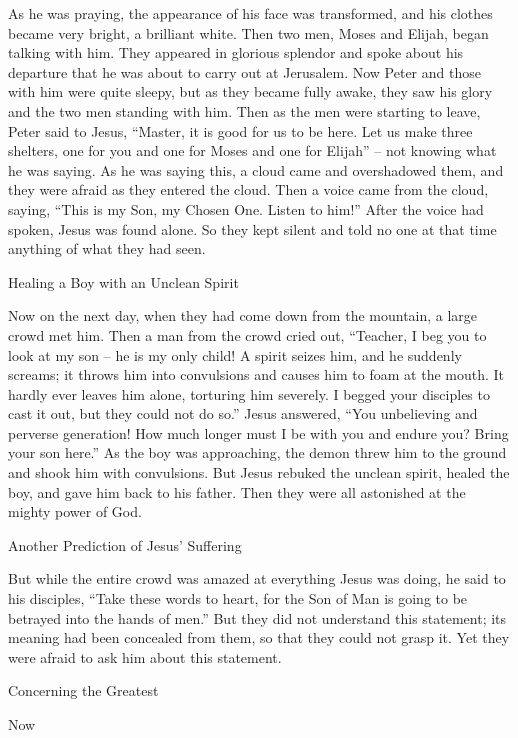 {As he was
praying,
the appearance
of his
face
was transformed,
and
his
clothes
became very bright, a brilliant
white.
Then
two
men,
Moses
and
Elijah,
began talking
with him.
They appeared
in
glorious splendor
and spoke
about his
departure
that he was
about
to carry out
at
Jerusalem.
Now
Peter
and
those with
him
were
quite sleepy,
but as they became fully awake,
they saw
his
glory
and
the two
men
standing
with him.
Then
as the men
were starting to leave,
Peter
said
to
Jesus,
“Master,
it is
good
for us
to be
here.
Let us make
three
shelters,
one
for you
and
one
for Moses
and
one
for Elijah”
– not
knowing
what
he was saying.
As he was saying
this,
a cloud
came
and
overshadowed
them,
and
they were afraid
as
they entered
the cloud.
Then
a voice
came
from
the cloud,
saying,
“This
is
my
Son,
my Chosen One.
Listen
to him!”
After the voice
had spoken, Jesus
was found
alone.
So
they
kept silent
and
told
no one
at
that
time
anything
of what
they had seen.
\par }{\SH Healing a Boy with an Unclean Spirit
\par }{\PP {}Now
on the next
day,
when
they
had come down
from
the mountain,
a
large
crowd
met
him.
Then
a man
from
the crowd
cried out, “Teacher,
I beg
you
to look
at
my
son
– he is
my
only child!
A spirit
seizes
him,
and
he
suddenly
screams;
it throws
him into convulsions
and causes him
to foam
at the mouth. It hardly ever
leaves
him
alone, torturing
him
severely.
I begged
your
disciples
to
cast
it
out,
but
they could
not
do so.”
Jesus
answered, “You unbelieving
and
perverse
generation! How much longer
must I be
with
you
and
endure
you? Bring
your
son
here.”
As the boy was approaching,
the demon
threw
him
to the ground
and
shook
him with convulsions.
But
Jesus
rebuked
the unclean
spirit,
healed
the
boy,
and
gave
him
back
to his
father.
Then
they were
all
astonished
at
the mighty power
of God.
\par }{\SH Another Prediction of Jesus’ Suffering
\par }{\PP But
while the entire
crowd was amazed
at
everything
Jesus was doing,
he said
to
his
disciples,
“Take
these
words
to
heart,
for
the Son
of Man
is going
to be betrayed
into
the hands
of men.”
But
they did not understand
this
statement;
its meaning had been concealed
from
them,
so that
they could
not
grasp
it.
Yet
they were afraid
to ask
him
about
this
statement.
\par }{\SH Concerning the Greatest
\par }{\PP {}Now
}
